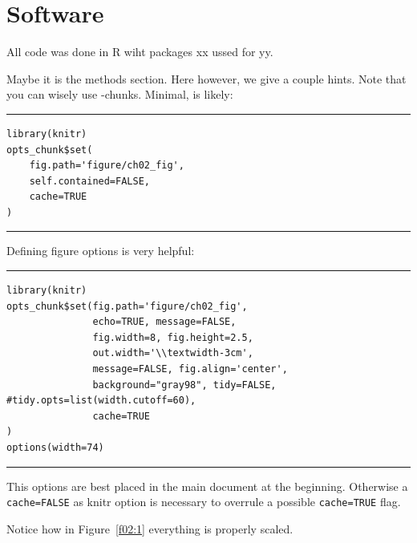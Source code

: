 \section{Software}

All code was done in R wiht packages xx ussed for yy.




Maybe it is the methods section. Here however, we give a couple hints.
Note that you can wisely use -chunks. Minimal, is likely:


\bigskip

\hrule
\begin{knitrout}
\color{fgcolor}\begin{kframe}
\begin{verbatim}
library(knitr)
opts_chunk$set(
    fig.path='figure/ch02_fig',
    self.contained=FALSE,
    cache=TRUE
)
\end{verbatim}
\end{kframe}
\end{knitrout}
\hrule

\bigskip

Defining figure options is very helpful:


\bigskip


\hrule
\begin{knitrout}
\color{fgcolor}\begin{kframe}
\begin{verbatim}
library(knitr)
opts_chunk$set(fig.path='figure/ch02_fig',
               echo=TRUE, message=FALSE,
               fig.width=8, fig.height=2.5,
               out.width='\\textwidth-3cm',
               message=FALSE, fig.align='center',
               background="gray98", tidy=FALSE, #tidy.opts=list(width.cutoff=60),
               cache=TRUE
)
options(width=74)
\end{verbatim}
\end{kframe}
\end{knitrout}
\hrule

\bigskip

This options are best placed in the main document at the beginning. Otherwise a \verb+cache=FALSE+ as knitr option is necessary to overrule a possible  \verb+cache=TRUE+ flag.

\bigskip

Notice how in Figure~\ref{f02:1} everything is properly scaled.


